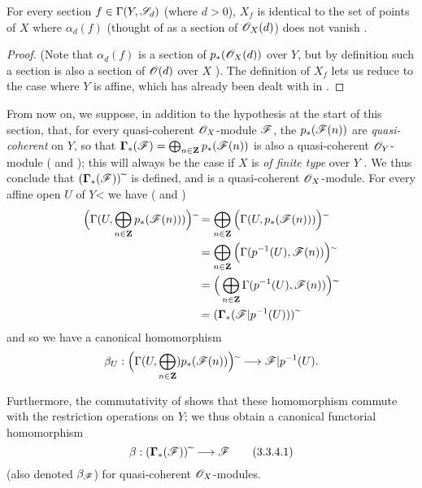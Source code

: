 \begin{proposition}[3.3.3]
\label{II.3.3.3}
For every section $f\in\Gamma(Y,\mathscr{S}_d)$ (where $d>0$), $X_f$ is identical to the set of points of $X$ where $\alpha_d(f)$ (thought of as a section of $\mathscr{O}_X(d)$) does not vanish .
\end{proposition}

\begin{proof}
(Note that $\alpha_d(f)$ is a section of $p_*(\mathscr{O}_X(d))$ over $Y$, but by definition such a section is also a section of $\mathscr{O}(d)$ over $X$ ).
The definition of $X_f$  lets us reduce to the case where $Y$ is affine, which has already been dealt with in .
\end{proof}

\begin{env}[3.3.4]
\label{II.3.4.4}
From now on, we suppose, in addition to the hypothesis at the start of this section, that, for every quasi-coherent $\mathscr{O}_X$-module $\mathscr{F}$, the $p_*(\mathscr{F}(n))$ are \emph{quasi-coherent} on $Y$, so that $\boldsymbol\Gamma_*(\mathscr{F})=\bigoplus_{n\in\mathbf{Z}}p_*(\mathscr{F}(n))$ is also a quasi-coherent $\mathscr{O}_Y$-module ( and );
this will always be the case if $X$ is \emph{of finite type} over $Y$ .
We thus conclude that $(\boldsymbol\Gamma_*(\mathscr{F})){\,\widetilde{\,}\,}$ is defined, and is a quasi-coherent $\mathscr{O}_X$-module.
For every affine open $U$ of $Y$< we have ( and )
\begin{align*}
  \Big( \Gamma(U,\bigoplus_{n\in\mathbf{Z}}p_*(\mathscr{F}(n))) \Big){\,\widetilde{\,}\,}
  &= \bigoplus_{n\in\mathbf{Z}}\Big( \Gamma(U,p_*(\mathscr{F}(n))) \Big){\,\widetilde{\,}\,}
\\&= \bigoplus_{n\in\mathbf{Z}}\Big( \Gamma(p^{-1}(U),\mathscr{F}(n)) \Big){\,\widetilde{\,}\,}
\\&= \Big( \bigoplus_{n\in\mathbf{Z}}\Gamma(p^{-1}(U),\mathscr{F}(n)) \Big){\,\widetilde{\,}\,}
\\&= (\boldsymbol\Gamma_*(\mathscr{F}|p^{-1}(U))){\,\widetilde{\,}\,}
\end{align*}
and so  we have a canonical homomorphism
\[
  \beta_U : \Big( \Gamma(U,\bigoplus_{n\in\bb{Z}})p_*(\sh{F}(n)) \Big)\supertilde \to \sh{F}|p^{-1}(U).
\]

Furthermore, the commutativity of  shows that these homomorphism commute with the restriction operations on $Y$;
we thus obtain a canonical functorial homomorphism
\[
\label{II.3.3.4.1}
  \beta : (\bbGamma_*(\sh{F}))\supertilde \to \sh{F}
\tag{3.3.4.1}
\]
(also denoted $\beta_{\mathscr{F}}$) for quasi-coherent $\mathscr{O}_X$-modules.
\end{env}

